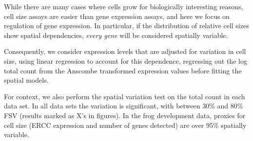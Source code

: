While there are many cases where cells grow for biologically interesting reasons, cell size assays are easier than gene expression assays, and here we focus on regulation of gene expression.  In particular, if the distribution of relative cell sizes show spatial dependencies, \emph{every gene} will be considered spatially variable.

Consequently, we consider expression levels that are adjusted for variation in cell size, using linear regression to account for this dependence, regressing out the log total count from the Anscombe transformed expression values before fitting the spatial models.

For context, we also perform the spatial variation test on the total count in each data set. In all data sets the variation is significant, with between 30\% and 80\% FSV (results marked as X's in figures). In the frog development data, proxies for cell size (ERCC expression and number of genes detected) are over 95\% spatially variable.

